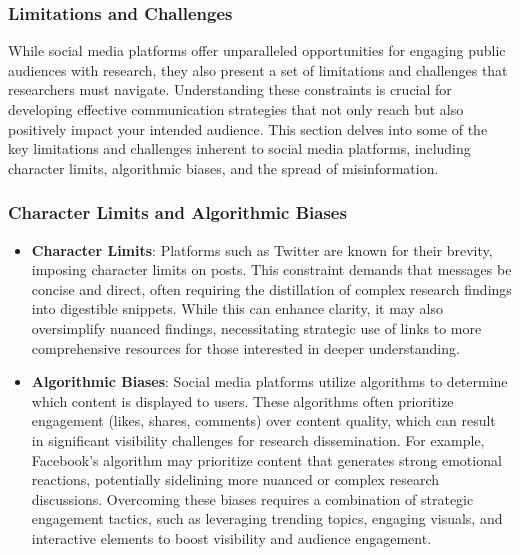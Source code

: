 \documentclass[
]{book}
\begin{document}
\hypertarget{limitations-and-challenges}{%
\subsubsection*{Limitations and Challenges}\label{limitations-and-challenges}}

While social media platforms offer unparalleled opportunities for engaging public audiences with research, they also present a set of limitations and challenges that researchers must navigate. Understanding these constraints is crucial for developing effective communication strategies that not only reach but also positively impact your intended audience. This section delves into some of the key limitations and challenges inherent to social media platforms, including character limits, algorithmic biases, and the spread of misinformation.

\hypertarget{character-limits-and-algorithmic-biases}{%
\subsubsection*{Character Limits and Algorithmic Biases}\label{character-limits-and-algorithmic-biases}}

\begin{itemize}
\item
  \textbf{Character Limits}: Platforms such as Twitter are known for their brevity, imposing character limits on posts. This constraint demands that messages be concise and direct, often requiring the distillation of complex research findings into digestible snippets. While this can enhance clarity, it may also oversimplify nuanced findings, necessitating strategic use of links to more comprehensive resources for those interested in deeper understanding.
\item
  \textbf{Algorithmic Biases}: Social media platforms utilize algorithms to determine which content is displayed to users. These algorithms often prioritize engagement (likes, shares, comments) over content quality, which can result in significant visibility challenges for research dissemination. For example, Facebook's algorithm may prioritize content that generates strong emotional reactions, potentially sidelining more nuanced or complex research discussions. Overcoming these biases requires a combination of strategic engagement tactics, such as leveraging trending topics, engaging visuals, and interactive elements to boost visibility and audience engagement.
\end{itemize}
\end{document}
